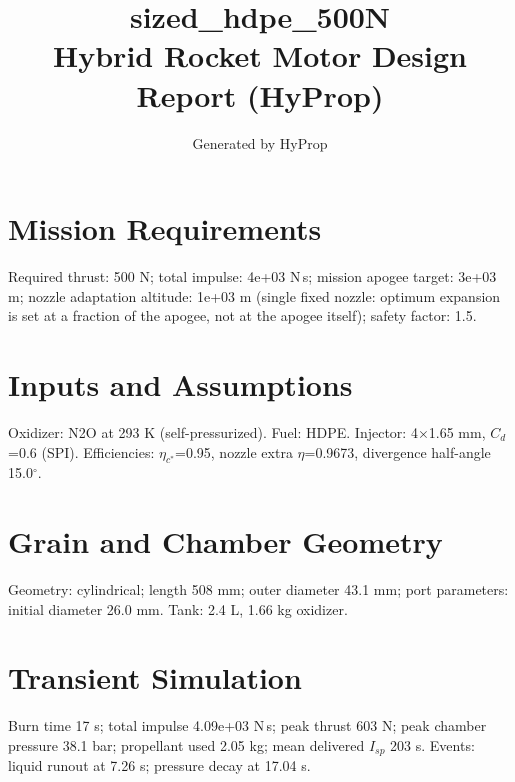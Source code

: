 \documentclass[11pt]{article}
\title{sized\_hdpe\_500N\\\large Hybrid Rocket Motor Design Report (HyProp)}
\author{Generated by HyProp}
\begin{document}
\maketitle
\section{Mission Requirements}
Required thrust: 500 N; total impulse: 4e+03 N\,s; mission apogee target: 3e+03 m; nozzle adaptation altitude: 1e+03 m (single fixed nozzle: optimum expansion is set at a fraction of the apogee, not at the apogee itself); safety factor: 1.5.
\section{Inputs and Assumptions}
Oxidizer: N2O at 293 K (self-pressurized). Fuel: HDPE. Injector: 4$\times$1.65 mm, $C_d$=0.6 (SPI). Efficiencies: $\eta_{c^*}$=0.95, nozzle extra $\eta$=0.9673, divergence half-angle 15.0$^\circ$.
\section{Grain and Chamber Geometry}
Geometry: cylindrical; length 508 mm; outer diameter 43.1 mm; port parameters: initial diameter 26.0 mm. Tank: 2.4 L, 1.66 kg oxidizer.
\section{Transient Simulation}
Burn time 17 s; total impulse 4.09e+03 N\,s; peak thrust 603 N; peak chamber pressure 38.1 bar; propellant used 2.05 kg; mean delivered $I_{sp}$ 203 s. Events: liquid runout at 7.26 s; pressure decay at 17.04 s.
\end{document}
